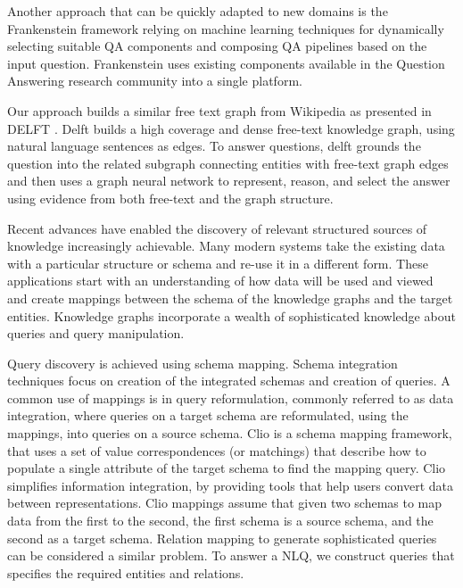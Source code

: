 Another approach that can be quickly adapted to new domains is the Frankenstein \cite{frankenstein} framework relying on machine learning techniques for dynamically selecting suitable QA components and composing QA pipelines based on the input question. Frankenstein uses existing components available in the Question Answering research community into a single platform. 

Our approach builds a similar free text graph from Wikipedia as presented in DELFT \cite{delft}. Delft builds a high coverage and dense free-text knowledge graph, using natural language sentences as edges. To answer questions, delft grounds the question into the related subgraph connecting entities with free-text graph edges and then uses a graph neural network to represent, reason, and select the answer using evidence from both free-text and the graph structure.

Recent advances have enabled the discovery of relevant structured sources of knowledge increasingly achievable. Many modern systems take the existing data with a particular structure or schema and re-use it in a different form. These applications start with an understanding of how data will be used and viewed and create mappings between the schema of the knowledge graphs and the target entities. Knowledge graphs incorporate a wealth of sophisticated knowledge about queries and query manipulation. 

Query discovery is achieved using schema mapping. Schema integration techniques focus on creation of the integrated schemas and creation of queries. A common use of mappings is in query reformulation, commonly referred to as data integration, where queries on a target schema are reformulated, using the mappings, into queries on a source schema.  Clio \cite{renne2000,Fagin2009} is a schema mapping framework, that uses a set of value correspondences (or matchings) that describe how to populate a single attribute of the target schema to find the mapping query. Clio simplifies information integration, by providing tools that help users convert data between representations. Clio mappings assume that given two schemas to map data from the first to the second, the first schema is a source schema, and the second as a target schema. Relation mapping to generate sophisticated queries can be considered a similar problem. To answer a NLQ, we construct queries that specifies the required entities and relations.


